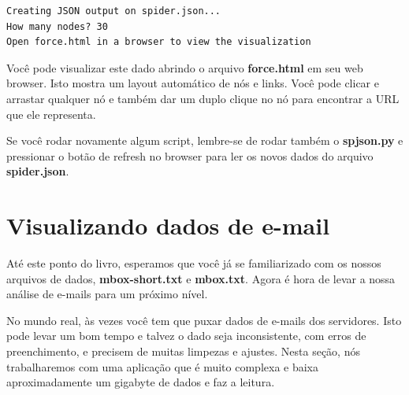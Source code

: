 \beforeverb
\begin{verbatim}
Creating JSON output on spider.json...
How many nodes? 30
Open force.html in a browser to view the visualization
\end{verbatim}
\afterverb
%

Você pode visualizar este dado abrindo o arquivo {\bf force.html} em seu web 
browser. Isto mostra um layout automático de nós e links. Você pode clicar e
arrastar qualquer nó e também dar um duplo clique no nó para encontrar a URL
que ele representa.

Se você rodar novamente algum script, lembre-se de rodar também o 
{\bf spjson.py} e pressionar o botão de refresh no browser para ler
os novos dados do arquivo {\bf spider.json}.

\section{Visualizando dados de e-mail}

Até este ponto do livro, esperamos que você já se familiarizado com os 
nossos arquivos de dados, {\bf mbox-short.txt} e {\bf mbox.txt}. Agora
é hora de levar a nossa análise de e-mails para um próximo nível.

No mundo real, às vezes você tem que puxar dados de e-mails dos servidores.
Isto pode levar um bom tempo e talvez o dado seja inconsistente, com erros
de preenchimento, e precisem de muitas limpezas e ajustes. Nesta seção, nós
trabalharemos com uma aplicação que é muito complexa e baixa aproximadamente
um gigabyte de dados e faz a leitura.

